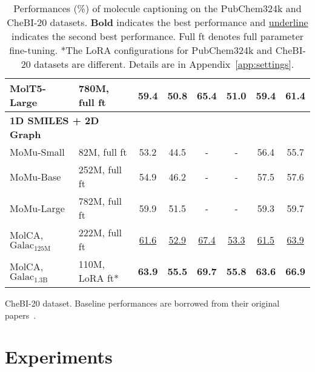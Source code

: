 \documentclass[11pt]{article}
\begin{document}
\begin{table*}[t]
\begin{subtable}[t]{\textwidth}
\begin{tabular}{llcccccc}
    MolT5-Large            & 780M, full ft                     & 59.4                 & 50.8                 & 65.4                 & 51.0                 & 59.4                 & 61.4                 \\\midrule
    \multicolumn{2}{l}{\textbf{1D SMILES + 2D Graph}} & \multicolumn{1}{l}{} & \multicolumn{1}{l}{} & \multicolumn{1}{l}{} & \multicolumn{1}{l}{} & \multicolumn{1}{l}{} & \multicolumn{1}{l}{} \\
    MoMu-Small             & 82M, full ft                      & 53.2                 & 44.5                 & -                    & -                    & 56.4                 & 55.7                 \\
    MoMu-Base              & 252M, full ft                     & 54.9                 & 46.2                 & -                    & -                    & 57.5                 & 57.6                 \\
    MoMu-Large             & 782M, full ft                     & 59.9                 & 51.5                 & -                    & -                    & 59.3                 & 59.7                 \\
    MolCA, $\text{Galac}_{\text{125M}}$ & 222M, full ft & \underline{61.6}          & \underline{52.9}          & \underline{67.4}          & \underline{53.3}          & \underline{61.5}          & \underline{63.9}          \\
    MolCA, $\text{Galac}_{\text{1.3B}}$              & 110M, LoRA ft*              & \textbf{63.9}        & \textbf{55.5}        & \textbf{69.7}        & \textbf{55.8}        & \textbf{63.6}        & \textbf{66.9}       \\\bottomrule
    \end{tabular} 
    \caption{CheBI-20 dataset. Baseline performances are borrowed from their original papers~\citep{MolT5, MoMu}.}
    \label{tab:chebi20_cap}
\end{subtable}
\caption{Performances (\%) of molecule captioning on the PubChem324k and CheBI-20 datasets. \textbf{Bold} indicates the best performance and \underline{underline} indicates the second best performance. Full ft denotes full parameter fine-tuning. *The LoRA configurations for PubChem324k and CheBI-20 datasets are different. Details are in Appendix~\ref{app:settings}.}
 \vspace{-4mm}
\label{tab:cap}
\end{table*}

\section{Experiments}
\end{document}
